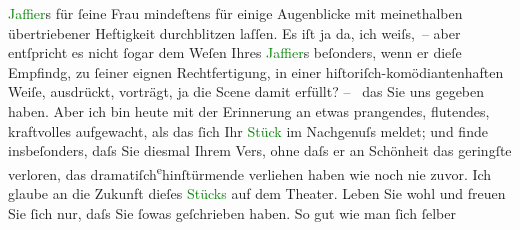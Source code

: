                   \textcolor{green}{Jaffier}{}s für ſeine Frau
               mindeſtens für einige Augenblicke mit meinethalben übertriebener Heftigkeit {\pb}durchblitzen laſſen. Es iſt ja da, ich weiſs, – aber
               entſpricht es nicht ſogar dem Weſen Ihres \textcolor{green}{Jaffier}{}s beſonders, wenn er dieſe Empfindg, zu ſeiner
               eignen Rechtfertigung, in einer hiſtoriſch-komödiantenhaften Weiſe, ausdrückt,
               vorträgt, ja die Scene damit erfüllt?\pend
           \pstart
           – \label{T_L01263_1v}\label{T_L01263_1h}{ }{\pb}das Sie uns gegeben haben. Aber ich bin heute mit der
               Erinnerung an etwas prangendes, flutendes, kraftvolles aufgewacht, als das ſich Ihr
                  \textcolor{green}{Stück}{} im Nachgenuſs meldet;
               und finde insbeſonders, daſs Sie diesmal Ihrem Vers, ohne daſs er an Schönheit das
               geringſte verloren, das dramatiſch\substVorne{}\textsuperscript{e}\substDazwischen{}hinſtürmende\substHinten{} verliehen haben wie noch nie zuvor. Ich glaube an die Zukunft dieſes \textcolor{green}{Stücks}{} auf dem Theater. Leben Sie
               wohl und freuen Sie ſich nur, daſs Sie ſowas geſchrieben haben. So gut wie man ſich
               ſelber \label{T_L01263_2v}\label{T_L01263_2h}\pend
           \endnumbering{}  
      